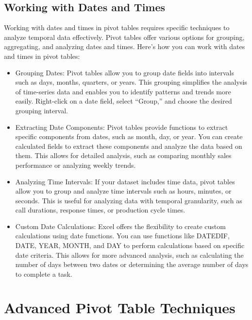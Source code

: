 \documentclass[
]{book}
\begin{document}
\hypertarget{working-with-dates-and-times}{%
\section{Working with Dates and Times}\label{working-with-dates-and-times}}

Working with dates and times in pivot tables requires specific techniques to analyze temporal data effectively. Pivot tables offer various options for grouping, aggregating, and analyzing dates and times. Here's how you can work with dates and times in pivot tables:

\begin{itemize}
\item
  Grouping Dates: Pivot tables allow you to group date fields into intervals such as days, months, quarters, or years. This grouping simplifies the analysis of time-series data and enables you to identify patterns and trends more easily. Right-click on a date field, select ``Group,'' and choose the desired grouping interval.
\item
  Extracting Date Components: Pivot tables provide functions to extract specific components from dates, such as month, day, or year. You can create calculated fields to extract these components and analyze the data based on them. This allows for detailed analysis, such as comparing monthly sales performance or analyzing weekly trends.
\item
  Analyzing Time Intervals: If your dataset includes time data, pivot tables allow you to group and analyze time intervals such as hours, minutes, or seconds. This is useful for analyzing data with temporal granularity, such as call durations, response times, or production cycle times.
\item
  Custom Date Calculations: Excel offers the flexibility to create custom calculations using date functions. You can use functions like DATEDIF, DATE, YEAR, MONTH, and DAY to perform calculations based on specific date criteria. This allows for more advanced analysis, such as calculating the number of days between two dates or determining the average number of days to complete a task.
\end{itemize}

\hypertarget{advanced-pivot-table-techniques}{%
\chapter{Advanced Pivot Table Techniques}\label{advanced-pivot-table-techniques}}
\end{document}

